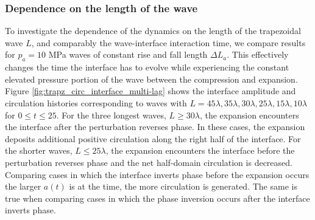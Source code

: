 \subsubsection{Dependence on the length of the wave}%
To investigate the dependence of the dynamics on the length of the
trapezoidal wave $L$, and comparably the wave-interface interaction
time, we compare results for $p_a=10$ MPa waves of constant rise and
fall length $\Delta L_a$. This effectively changes the time the
interface has to evolve while experiencing the constant elevated
pressure portion of the wave between the compression and expansion.
Figure \ref{fig:trapz_circ_interface_multi-lag} shows the interface
amplitude and circulation histories corresponding to waves with
$L=45\lambda, 35\lambda ,30\lambda ,25\lambda ,15\lambda ,10\lambda$
for $0 \leq t\leq 25$.  For the three longest waves, $L \geq 30\lambda$,
the expansion encounters the interface after the perturbation reverses
phase. In these cases, the expansion deposits additional positive
circulation along the right half of the interface. For the shorter
waves, $L \leq 25\lambda$, the expansion encounters the interface before
the perturbation reverses phase and the net half-domain circulation is
decreased. Comparing cases in which the interface inverts phase before
the expansion occurs the larger $a(t)$ is at the time, the more
circulation is generated. The same is true when comparing cases in
which the phase inversion occurs after the interface inverts phase.
%
